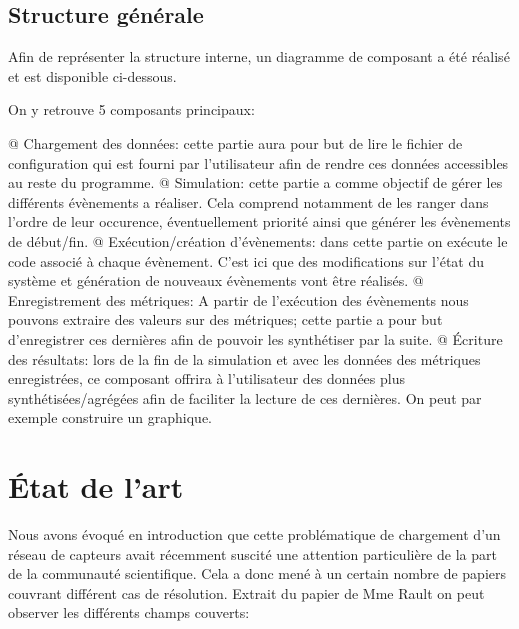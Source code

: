 \documentclass[final]{polytech/polytech}
\begin{document}
			
	\section{Structure générale}
		Afin de représenter la structure interne, un diagramme de composant a été réalisé et est disponible ci-dessous.
		
		
		On y retrouve 5 composants principaux:
		\begin{easylist}[itemize]
			@ Chargement des données: cette partie aura pour but de lire le fichier de configuration qui est fourni par l'utilisateur afin de rendre ces données accessibles au reste du programme.
			@ Simulation: cette partie a comme objectif de gérer les différents évènements a réaliser. Cela comprend notamment de les ranger dans l'ordre de leur occurence, éventuellement priorité ainsi que générer les évènements de début/fin.
			@ Exécution/création d'évènements: dans cette partie on exécute le code associé à chaque évènement. C'est ici que des modifications sur l'état du système et génération de nouveaux évènements vont être réalisés.
			@ Enregistrement des métriques: A partir de l'exécution des évènements nous pouvons extraire des valeurs sur des métriques; cette partie a pour but d'enregistrer ces dernières afin de pouvoir les synthétiser par la suite.
			@ Écriture des résultats: lors de la fin de la simulation et avec les données des métriques enregistrées, ce composant offrira à l'utilisateur des données plus synthétisées/agrégées afin de faciliter la lecture de ces dernières. On peut par exemple construire un graphique.	
		\end{easylist}

\chapter{État de l'art}
	Nous avons évoqué en introduction que cette problématique de chargement d'un réseau de capteurs avait récemment suscité une attention particulière de la part de la communauté scientifique.
	Cela a donc mené à un certain nombre de papiers couvrant différent cas de résolution.
	Extrait du papier de Mme Rault \cite{Rault:chargers} on peut observer les différents champs couverts:
	
\end{document}
